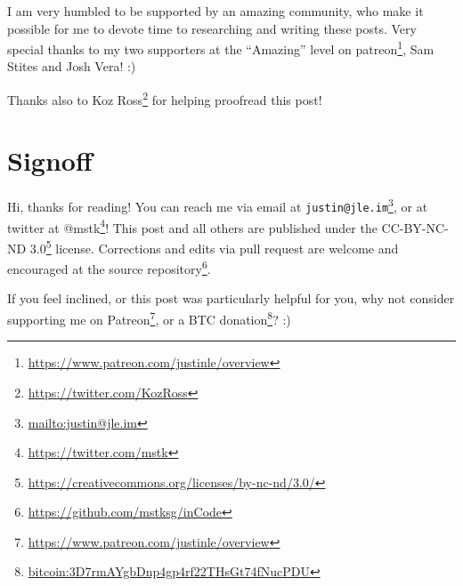 \documentclass[]{article}
\renewcommand{\href}[2]{#2\footnote{\url{#1}}}
\begin{document}
I am very humbled to be supported by an amazing community, who make it possible
for me to devote time to researching and writing these posts. Very special
thanks to my two supporters at the ``Amazing'' level on
\href{https://www.patreon.com/justinle/overview}{patreon}, Sam Stites and Josh
Vera! :)

Thanks also to \href{https://twitter.com/KozRoss}{Koz Ross} for helping
proofread this post!

\hypertarget{signoff}{%
\section{Signoff}\label{signoff}}

Hi, thanks for reading! You can reach me via email at
\href{mailto:justin@jle.im}{\nolinkurl{justin@jle.im}}, or at twitter at
\href{https://twitter.com/mstk}{@mstk}! This post and all others are published
under the \href{https://creativecommons.org/licenses/by-nc-nd/3.0/}{CC-BY-NC-ND
3.0} license. Corrections and edits via pull request are welcome and encouraged
at \href{https://github.com/mstksg/inCode}{the source repository}.

If you feel inclined, or this post was particularly helpful for you, why not
consider \href{https://www.patreon.com/justinle/overview}{supporting me on
Patreon}, or a \href{bitcoin:3D7rmAYgbDnp4gp4rf22THsGt74fNucPDU}{BTC donation}?
:)
\end{document}
